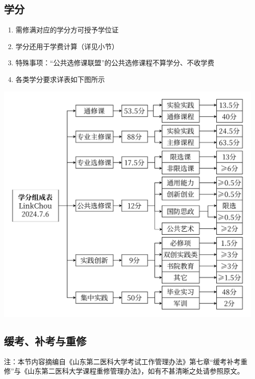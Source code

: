 \subsection[学分]{学分}
\begin{enumerate}
    \item 需修满对应的学分方可授予学位证
    \item 学分还用于学费计算（详见小节）
    \item 特殊事项：“公共选修课联盟”的公共选修课程不算学分、不收学费
    \item 各类学分要求详表\footnotemark 如下图所示
\end{enumerate}

\pagebreak[3]

\begin{table}[H]
    \centering
    \includegraphics[width=\textwidth]{resources/sundry/学分.pdf}
    \label{credit}
\end{table}

\subsection[缓考、补考与重修]{缓考、补考与重修}
\label{retake}
注：本节内容摘编自《山东第二医科大学考试工作管理办法》第七章“缓考补考重修”与《山东第二医科大学课程重修管理办法》，如有不甚清晰之处请参照原文。


